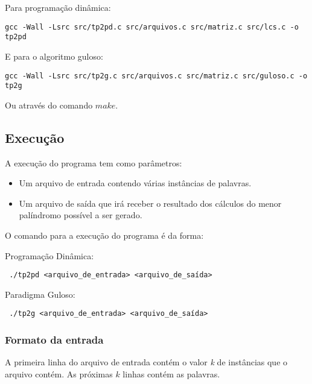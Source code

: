 \documentclass[12pt]{article}
\begin{document}
Para programação dinâmica:
\begin{footnotesize}
\begin{verbatim}
gcc -Wall -Lsrc src/tp2pd.c src/arquivos.c src/matriz.c src/lcs.c -o tp2pd \end{verbatim}
\end{footnotesize}

E para o algoritmo guloso:
\begin{footnotesize}
\begin{verbatim}
gcc -Wall -Lsrc src/tp2g.c src/arquivos.c src/matriz.c src/guloso.c -o tp2g \end{verbatim}
\end{footnotesize}

Ou através do comando $make$.

\subsection{Execução}

A execução do programa tem como parâmetros:
\begin{itemize}
\item Um arquivo de entrada contendo várias instâncias de palavras.
\item Um arquivo de saída que irá receber o resultado dos cálculos do menor palíndromo possível a ser gerado.
\end{itemize}

O comando para a execução do programa é da forma:

Programação Dinâmica:
\begin{footnotesize}
\begin{verbatim} ./tp2pd <arquivo_de_entrada> <arquivo_de_saída>\end{verbatim}
\end{footnotesize}

Paradigma Guloso:
\begin{footnotesize}
\begin{verbatim} ./tp2g <arquivo_de_entrada> <arquivo_de_saída>\end{verbatim}
\end{footnotesize}

\subsubsection{Formato da entrada}

A primeira linha do arquivo de entrada contém o valor \textit{k} de instâncias que o arquivo contém. As próximas $k$ linhas contém as palavras.
\end{document}
